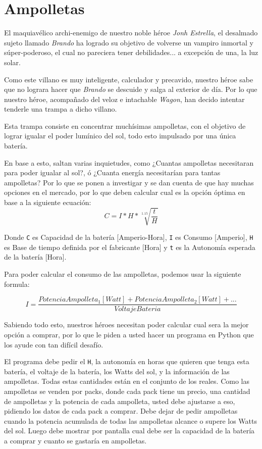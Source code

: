 \section{Ampolletas}

El maquiavélico archi-enemigo de nuestro noble héroe \textit{Jonh Estrella}, el desalmado sujeto llamado \textit{Brando} ha logrado su objetivo de volverse un vampiro inmortal y súper-poderoso, el cual no pareciera tener debilidades... a excepción de una, la luz solar.

Como este villano es muy inteligente, calculador y precavido, nuestro héroe sabe que no lograra hacer que \textit{Brando} se descuide y salga al exterior de día. Por lo que nuestro héroe, acompañado del veloz e intachable \textit{Wagon}, han decido intentar tenderle una trampa a dicho villano.

Esta trampa consiste en concentrar muchísimas ampolletas, con el objetivo de lograr igualar el poder lumínico del sol, todo esto impulsado por una única batería.

En base a esto, saltan varias inquietudes, como ¿Cuantas ampolletas necesitaran para poder igualar al sol?, ó ¿Cuanta energía necesitarían para tantas ampolletas? Por lo que se ponen a investigar y se dan cuenta de que hay muchas opciones en el mercado, por lo que deben calcular cual es la opción óptima en base a la siguiente ecuación:
\begin{equation*}
    C = I*H*\sqrt[1.15]{\frac{t}{H}}
\end{equation*}

Donde \texttt{C} es Capacidad de la batería [Amperio-Hora], \texttt{I} es Consumo [Amperio], \texttt{H} es Base de tiempo definida por el fabricante [Hora] y \texttt{t} es la Autonomía esperada de la batería [Hora].

Para poder calcular el consumo de las ampolletas, podemos usar la siguiente formula:

\begin{equation*}
    I = \frac{PotenciaAmpolleta_{1}[Watt] + PotenciaAmpolleta_{2}[Watt] + ...}{VoltajeBateria}
\end{equation*}

Sabiendo todo esto, nuestros héroes necesitan poder calcular cual sera la mejor opción a comprar, por lo que le piden a usted hacer un programa en Python que los ayude con tan difícil desafío.

El programa debe pedir el \texttt{H}, la autonomía en horas que quieren que tenga esta batería, el voltaje de la batería, los Watts del sol, y la información de las ampolletas. Todas estas cantidades están en el conjunto de los reales.
Como las ampolletas se venden por packs, donde cada pack tiene un precio, una cantidad de ampolletas y la potencia de cada ampolleta, usted debe ajustarse a eso, pidiendo los datos de cada pack a comprar. Debe dejar de pedir ampolletas cuando la potencia acumulada de todas las ampolletas alcance o supere los Watts del sol. 
Luego debe mostrar por pantalla cual debe ser la capacidad de la batería a comprar y cuanto se gastaría en ampolletas.

